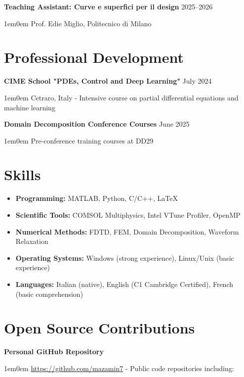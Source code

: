 \documentclass[11pt,a4paper]{article}
\newcommand{\cvdetail}[1]{%
  \begin{adjustwidth}{1em}{0em}
    #1
  \end{adjustwidth}%
  \vspace{0.5em}%
}
\newcommand{\cvsubitem}[2]{%
  \vspace{0.3em}%
  \noindent\textbf{#1} \hfill #2%
  \vspace{0.2em}%
}
\begin{document}
\cvsubitem{Teaching Assistant: Curve e superfici per il design}{2025--2026}
\cvdetail{Prof. Edie Miglio, Politecnico di Milano}

\section{Professional Development}

\cvsubitem{CIME School "PDEs, Control and Deep Learning"}{July 2024}
\cvdetail{Cetraro, Italy - Intensive course on partial differential equations and machine learning}

\cvsubitem{Domain Decomposition Conference Courses}{June 2025}
\cvdetail{Pre-conference training courses at DD29}

\section{Skills}

\begin{itemize}
  \item \textbf{Programming:} MATLAB, Python, C/C++, \LaTeX
  \item \textbf{Scientific Tools:} COMSOL Multiphysics, Intel VTune Profiler, OpenMP
  \item \textbf{Numerical Methods:} FDTD, FEM, Domain Decomposition, Waveform Relaxation
  \item \textbf{Operating Systems:} Windows (strong experience), Linux/Unix (basic experience)
  \item \textbf{Languages:} Italian (native), English (C1 Cambridge Certified), French (basic comprehension)
\end{itemize}

\newpage
\section{Open Source Contributions}

\cvsubitem{Personal GitHub Repository}{}
\cvdetail{\url{https://github.com/mazamin7} - Public code repositories including:}
\end{document}
